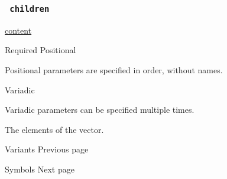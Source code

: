 \subsubsection{\texorpdfstring{\texttt{\ children\ }}{ children }}\label{parameters-children}

\href{/docs/reference/foundations/content/}{content}

{Required} {{ Positional }}

\label{parameters-children-positional-tooltip}
Positional parameters are specified in order, without names.

{{ Variadic }}

\label{parameters-children-variadic-tooltip}
Variadic parameters can be specified multiple times.

The elements of the vector.

\href{/docs/reference/math/variants/}{\pandocbounded{}}

{ Variants } { Previous page }

\href{/docs/reference/symbols/}{\pandocbounded{}}

{ Symbols } { Next page }
